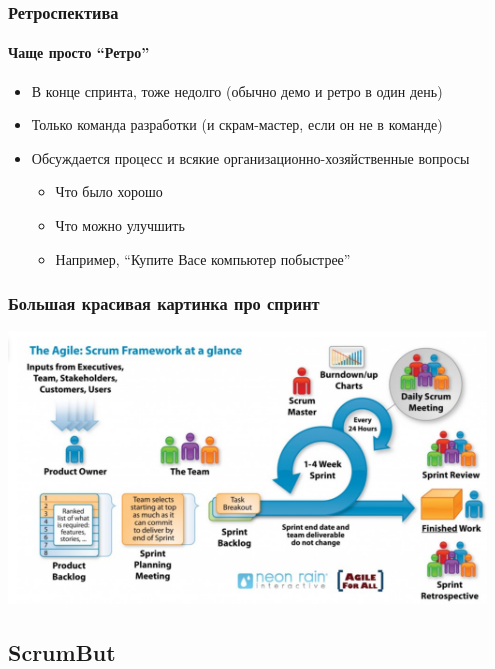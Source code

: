 \documentclass{../../slides-style}
\begin{document}
    \begin{frame}
        \frametitle{Ретроспектива}
        \framesubtitle{Чаще просто ``Ретро''}
        \begin{itemize}
            \item В конце спринта, тоже недолго (обычно демо и ретро в один день)
            \item Только команда разработки (и скрам-мастер, если он не в команде)
            \item Обсуждается процесс и всякие организационно-хозяйственные вопросы
            \begin{itemize}
                \item Что было хорошо
                \item Что можно улучшить
                \item Например, ``Купите Васе компьютер побыстрее''
            \end{itemize}
        \end{itemize}
    \end{frame}

    \begin{frame}
        \frametitle{Большая красивая картинка про спринт}
        \begin{center}
            \includegraphics[width=0.95\textwidth]{sprint.png}
        \end{center}
    \end{frame}

    \subsection{ScrumBut}
\end{document}
